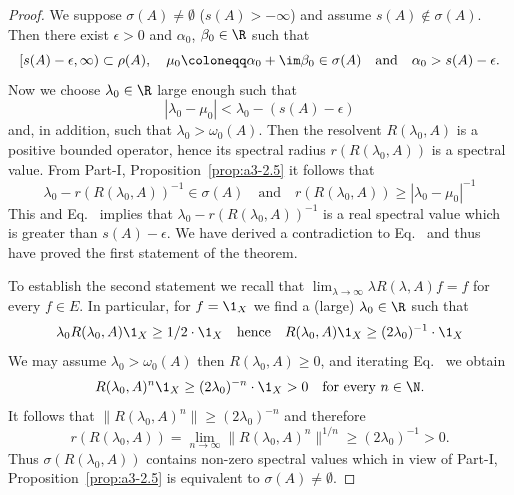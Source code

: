 \begin{proof}
	We suppose $\sigma(A) \neq \emptyset$ (\ie $s(A) > -\infty$) and assume $s(A) \notin \sigma(A)$.
	Then there exist $\epsilon > 0$ and $\alpha_{0}$, $\beta_{0} \in \R$ such that
	\begin{equation}\label{eq:b3-1.1}
		[s(A)-\epsilon,\infty) \subset \rho(A), \quad \mu_{0} \coloneqq \alpha_{0} + \im\beta_{0} \in \sigma(A) \quad \text{and} \quad \alpha_{0} > s(A)-\epsilon.
	\end{equation}
	Now we choose $\lambda_{0} \in \R$ large enough such that
	\begin{equation}\label{eq:b3-1.2}
		|\lambda_{0} - \mu_{0}| < \lambda_{0} - (s(A) - \epsilon)
	\end{equation}
	and, in addition, such that $\lambda_{0} > \omega_{0}(A)$.
	Then the resolvent $R(\lambda_{0},A)$ is a positive bounded operator, hence its spectral radius $r(R(\lambda_{0},A))$ is a spectral value.
	From Part-I, Proposition~\ref{prop:a3-2.5} it follows that
	\begin{equation}\label{eq:b3-1.3}
		\lambda_{0} - r(R(\lambda_{0},A))^{-1} \in \sigma(A) \quad \text{and} \quad r(R(\lambda_{0},A)) \geq |\lambda_{0} - \mu_{0}|^{-1}
	\end{equation}
	This and Eq.~ implies that $\lambda_{0} - r(R(\lambda_{0},A))^{-1}$ is a real spectral value which is greater than $s(A) - \epsilon$.
	We have derived a contradiction to Eq.~ and thus have proved the first statement of the theorem.
	
	To establish the second statement we recall that $\lim_{\lambda \to \infty}\lambda R(\lambda,A)f = f$ for every $f \in E$.
	In particular, for $f = \1_{X}$ we find a (large) $\lambda_{0} \in \R$ such that
	\begin{equation}\label{eq:b3-1.4}
		\lambda_{0}R(\lambda_{0},A)\1_{X} \geq 1/2\cdot\1_{X} \quad \text{hence} \quad R(\lambda_{0},A)\1_{X} \geq (2\lambda_{0})^{-1}\cdot\1_{X}
	\end{equation}
	We may assume $\lambda_{0} > \omega_{0}(A)$ then $R(\lambda_{0},A) \geq 0$, and iterating Eq.~ we obtain
	\begin{equation}\label{eq:b3-1.5}
		R(\lambda_{0},A)^{n}\1_{X} \geq (2\lambda_{0})^{-n}\cdot\1_{X} > 0 \quad \text{for every } n \in \N.
	\end{equation}
	It follows that $\|R(\lambda_{0},A)^{n}\| \geq (2\lambda_{0})^{-n}$ and therefore
	\begin{equation}\label{eq:b3-1.6}
		r(R(\lambda_{0},A)) = \lim_{n \to \infty}\|R(\lambda_{0},A)^{n}\|^{1/n} \geq (2\lambda_{0})^{-1} > 0.
	\end{equation}
	Thus $\sigma(R(\lambda_{0},A))$ contains non-zero spectral values which in view of Part-I, Proposition~\ref{prop:a3-2.5} is equivalent to $\sigma(A) \neq \emptyset$.
\end{proof}
